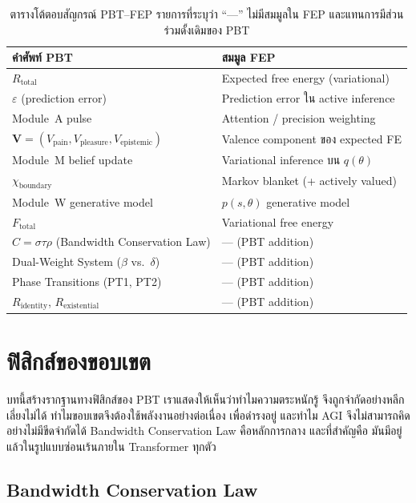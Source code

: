 \documentclass[12pt,a4paper]{article}
\newcommand{\Rtot}{R_{\mathrm{total}}}
\newcommand{\Rid}{R_{\mathrm{identity}}}
\newcommand{\Rex}{R_{\mathrm{existential}}}
\newcommand{\vpain}{V_{\mathrm{pain}}}
\newcommand{\vpleasure}{V_{\mathrm{pleasure}}}
\newcommand{\vepi}{V_{\mathrm{epistemic}}}
\newcommand{\chiB}{\chi_{\mathrm{boundary}}}
\begin{document}
\begin{table}[!htbp]
\centering
\caption{ตารางโต้ตอบสัญกรณ์ PBT--FEP รายการที่ระบุว่า ``---'' ไม่มีสมมูลใน FEP
และแทนการมีส่วนร่วมดั้งเดิมของ PBT}
\label{tab:fep_mapping}
\small
\begin{tabular}{@{}L{5.5cm}L{7.0cm}@{}}
\toprule
\textbf{คำศัพท์ PBT} & \textbf{สมมูล FEP} \\
\midrule
$\Rtot$ & Expected free energy (variational) \\
$\varepsilon$ (prediction error) & Prediction error ใน active inference \\
Module~A pulse & Attention / precision weighting \\
$\mathbf{V} = (\vpain,\vpleasure,\vepi)$ & Valence component ของ expected FE \\
Module~M belief update & Variational inference บน $q(\theta)$ \\
$\chiB$ & Markov blanket (+ actively valued) \\
Module~W generative model & $p(s,\theta)$ generative model \\
$F_{\mathrm{total}}$ & Variational free energy \\
$C = \sigma\tau\rho$ (Bandwidth Conservation Law) & --- (PBT addition) \\
Dual-Weight System ($\beta$ vs.\ $\delta$) & --- (PBT addition) \\
Phase Transitions (PT1, PT2) & --- (PBT addition) \\
$\Rid$, $\Rex$ & --- (PBT addition) \\
\bottomrule
\end{tabular}
\end{table}


\FloatBarrier
\section{ฟิสิกส์ของขอบเขต}
\label{sec:physics}

บทนี้สร้างรากฐานทางฟิสิกส์ของ PBT เราแสดงให้เห็นว่าทำไมความตระหนักรู้
จึงถูกจำกัดอย่างหลีกเลี่ยงไม่ได้ ทำไมขอบเขตจึงต้องใช้พลังงานอย่างต่อเนื่อง
เพื่อดำรงอยู่ และทำไม AGI จึงไม่สามารถคิดอย่างไม่มีขีดจำกัดได้
Bandwidth Conservation Law คือหลักการกลาง และที่สำคัญคือ
มันมีอยู่แล้วในรูปแบบซ่อนเร้นภายใน Transformer ทุกตัว

\subsection{Bandwidth Conservation Law}
\end{document}
